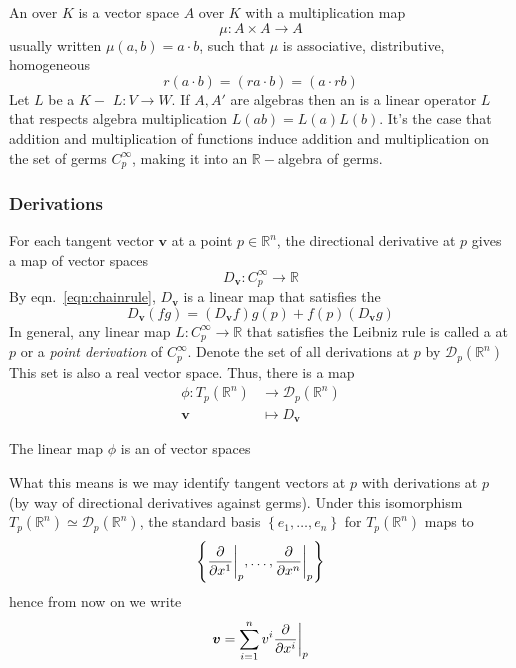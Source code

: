 An  over  \(K\) is a vector space \(A\) over \(K\) with a multiplication map 
%
\begin{equation}
    \mu\colon A \times A \rightarrow A 
\end{equation}
%
usually written \(\mu(a,b)=a \cdot b\), such that \(\mu\) is associative, distributive, homogeneous
%
\begin{equation}
    r(a\cdot b) = (ra \cdot b) = (a\cdot rb)
\end{equation}
%
Let \(L\) be a \(K-\) \(L\colon V \rightarrow W\). 
%
If \(A, A'\) are algebras then an  is a linear operator \(L\) that respects algebra multiplication \(L(ab) = L(a)L(b)\).
%
It's the case that addition and multiplication of functions induce addition and multiplication on the set of germs \(C_p^\infty\), making it into an \(\mathbb{R}-\)algebra of germs.

\subsubsection{Derivations}

For each tangent vector \(\bm{v}\) at a point \(p \in \mathbb{R}^n\), the directional derivative at \(p\) gives a map of vector spaces
%
\begin{equation*}
    D_{\bm{v}} \colon C_p^\infty \rightarrow \mathbb{R}
\end{equation*}
%
By eqn.~\eqref{eqn:chainrule}, \(D_{\bm{v}}\) is a linear map that satisfies the 
%
\begin{equation}
    D_{\bm{v}}(fg) = (D_{\bm{v}}f)g(p) + f(p) (D_{\bm{v}}g)
\end{equation}
%
In general, any linear map \(L\colon C_p^\infty \rightarrow \mathbb{R}\) that satisfies the Leibniz rule is called a  at \(p\) or a \textit{point derivation} of \(C_p^\infty\). 
%
Denote the set of all derivations at \(p\) by \(\mathcal{D}_p(\mathbb{R}^n)\)
%
This set is also a real vector space.
%
Thus, there is a map
\begin{align*}
    \phi\colon T_p(\mathbb{R}^n) &\rightarrow \mathcal{D}_p (\mathbb{R}^n) \\
    \bm{v} &\mapsto D_{\bm{v}}
\end{align*}
%
\begin{theorem}
    The linear map \(\phi\) is an  of vector spaces
\end{theorem}
%
What this means is we may identify tangent vectors at \(p\) with derivations at \(p\) (by way of directional derivatives against germs).
%
Under this isomorphism \(T_p(\mathbb{R}^n) \simeq \mathcal{D}_p(\mathbb{R}^n)\), the standard basis \(\left\{ e_1, \dots, e_n \right\}\) for \(T_p(\mathbb{R}^n)\) maps to
%
\begin{equation*}
    \left\{\evalat[\bigg]{\pdv{}{x^1}}{p}, \dots, \evalat[\bigg]{\pdv{}{x^n}}{p}  \right\} 
\end{equation*}
%
hence from now on we write
%
\begin{equation}
   \bm{v} = \sum_{i=1}^{n} v^i \evalat[\bigg]{\pdv{}{x^i}}{p}
\end{equation}